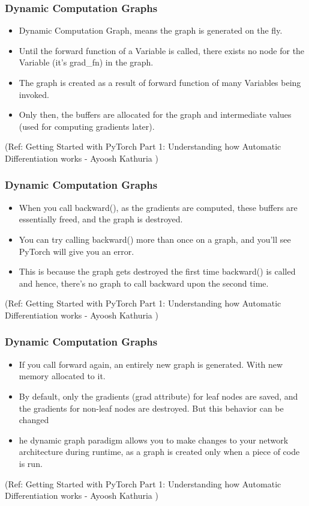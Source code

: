 \begin{frame}[fragile] \frametitle{Dynamic Computation Graphs}

\begin{itemize}
\item Dynamic Computation Graph, means the graph is generated on the fly.
\item Until the forward function of a Variable is called, there exists no node for the Variable (it's grad\_fn) in the graph.
\item The graph is created as a result of forward function of many Variables being invoked. 
\item Only then, the buffers are allocated for the graph and intermediate values (used for computing gradients later). 
\end{itemize}

{\tiny (Ref: Getting Started with PyTorch Part 1: Understanding how Automatic Differentiation works - Ayoosh Kathuria )}
\end{frame}



\begin{frame}[fragile] \frametitle{Dynamic Computation Graphs}

\begin{itemize}
\item When you call backward(), as the gradients are computed, these buffers are essentially freed, and the graph is destroyed. 
\item You can try calling backward() more than once on a graph, and you'll see PyTorch will give you an error. 
\item This is because the graph gets destroyed the first time backward() is called and hence, there's no graph to call backward upon the second time.
\end{itemize}

{\tiny (Ref: Getting Started with PyTorch Part 1: Understanding how Automatic Differentiation works - Ayoosh Kathuria )}
\end{frame}

\begin{frame}[fragile] \frametitle{Dynamic Computation Graphs}

\begin{itemize}
\item If you call forward again, an entirely new graph is generated. With new memory allocated to it.
\item By default, only the gradients (grad attribute) for leaf nodes are saved, and the gradients for non-leaf nodes are destroyed. But this behavior can be changed
\item he dynamic graph paradigm allows you to make changes to your network architecture during runtime, as a graph is created only when a piece of code is run. 
\end{itemize}

{\tiny (Ref: Getting Started with PyTorch Part 1: Understanding how Automatic Differentiation works - Ayoosh Kathuria )}
\end{frame}


